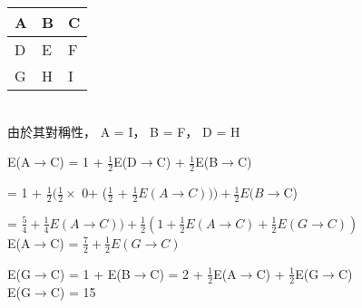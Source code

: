 \documentclass{article}
\begin{document}
\fontsize{13pt}{20pt}\selectfont

\begin{CJK}{UTF8}{bsmi} %
\begin{tabular}[t]{|l|l|l|}
\hline
A & B & C\\
\hline
D & E & F\\
\hline
G & H & I \\
\hline
\end{tabular} 
\\


由於其對稱性， A = I， B = F， D = H

\noindent
E(A$\rightarrow$C) = 1 + $\frac{1}{2}$E(D$\rightarrow$C) + $\frac{1}{2}$E(B$\rightarrow$C)

= 1 + $\frac{1}{2}(\frac{1}{2} \times$ 0+ ($\frac{1}{2}$ + $\frac{1}{2}E(A\rightarrow C))) + \frac{1}{2}E(B \rightarrow$C)

= $\frac{5}{4} + \frac{1}{4}E(A\rightarrow C)) + \frac{1}{2}(1+\frac{1}{2}E(A\rightarrow C) + \frac{1}{2}E(G\rightarrow C))$\\
E(A$\rightarrow$C) = $\frac{7}{2} + \frac{1}{2}E(G\rightarrow C)$

\noindent
E(G$\rightarrow$C) = 1 + E(B$\rightarrow$C)
= 2 + $\frac{1}{2}$E(A$\rightarrow$C) + $\frac{1}{2}$E(G$\rightarrow$C)\\
E(G$\rightarrow$C) = 15
\end{CJK} %
\end{document}
